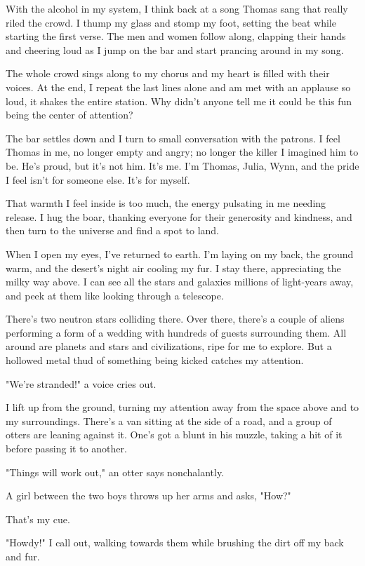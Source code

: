 With the alcohol in my system, I think back at a song Thomas sang that really riled the crowd. I thump my glass and stomp my foot, setting the beat while starting the first verse. The men and women follow along, clapping their hands and cheering loud as I jump on the bar and start prancing around in my song.

The whole crowd sings along to my chorus and my heart is filled with their voices. At the end, I repeat the last lines alone and am met with an applause so loud, it shakes the entire station. Why didn't anyone tell me it could be this fun being the center of attention?

The bar settles down and I turn to small conversation with the patrons. I feel Thomas in me, no longer empty and angry; no longer the killer I imagined him to be. He's proud, but it's not him. It's me. I'm Thomas, Julia, Wynn, and the pride I feel isn't for someone else. It's for myself.

That warmth I feel inside is too much, the energy pulsating in me needing release. I hug the boar, thanking everyone for their generosity and kindness, and then turn to the universe and find a spot to land.

When I open my eyes, I've returned to earth. I'm laying on my back, the ground warm, and the desert's night air cooling my fur. I stay there, appreciating the milky way above. I can see all the stars and galaxies millions of light-years away, and peek at them like looking through a telescope.

There's two neutron stars colliding there. Over there, there's a couple of aliens performing a form of a wedding with hundreds of guests surrounding them. All around are planets and stars and civilizations, ripe for me to explore. But a hollowed metal thud of something being kicked catches my attention.

"We're stranded!" a voice cries out.

I lift up from the ground, turning my attention away from the space above and to my surroundings. There's a van sitting at the side of a road, and a group of otters are leaning against it. One's got a blunt in his muzzle, taking a hit of it before passing it to another.

"Things will work out," an otter says nonchalantly.

A girl between the two boys throws up her arms and asks, "How?"

That's my cue.

"Howdy!" I call out, walking towards them while brushing the dirt off my back and fur.

